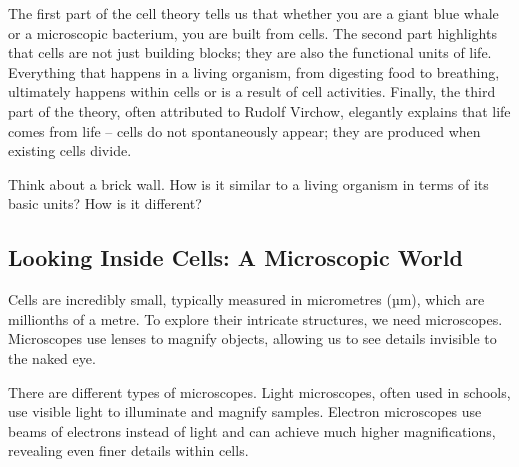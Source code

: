 
The first part of the cell theory tells us that whether you are a giant blue whale or a microscopic bacterium, you are built from cells.  The second part highlights that cells are not just building blocks; they are also the functional units of life.  Everything that happens in a living organism, from digesting food to breathing, ultimately happens within cells or is a result of cell activities. Finally, the third part of the theory, often attributed to Rudolf Virchow, elegantly explains that life comes from life – cells do not spontaneously appear; they are produced when existing cells divide. 

\begin{stopandthink}
Think about a brick wall. How is it similar to a living organism in terms of its basic units? How is it different?
\end{stopandthink}

\subsection{Looking Inside Cells: A Microscopic World}

Cells are incredibly small, typically measured in micrometres (µm), which are millionths of a metre. To explore their intricate structures, we need microscopes.  Microscopes use lenses to magnify objects, allowing us to see details invisible to the naked eye. 

There are different types of microscopes. Light microscopes, often used in schools, use visible light to illuminate and magnify samples. Electron microscopes use beams of electrons instead of light and can achieve much higher magnifications, revealing even finer details within cells. 

